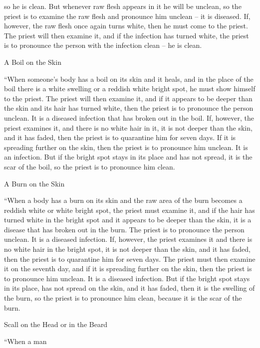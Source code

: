 {so he is clean.
But
whenever raw
flesh
appears
in it he will be unclean,
so
the priest
is to examine
the raw
flesh
and pronounce
him unclean –
it is
diseased.
If, however,
the raw
flesh
once again
turns
white,
then he must come
to
the priest.
The priest
will then examine
it, and if the infection
has turned
white,
the priest
is to pronounce the person with the infection
clean –
he is
clean.
\par }{\SH A Boil on the Skin
\par }{\PP {}“When
someone’s body
has
a boil
on its skin
and it heals,
and in the place
of the boil
there is a white
swelling
or
a reddish
white
bright spot,
he must show
himself to
the priest.
The priest
will then examine
it, and if it appears
to be deeper
than
the skin
and its hair
has turned
white,
then the priest
is to pronounce the person unclean.
It is a diseased
infection
that has broken
out in the boil.
If,
however, the priest
examines
it, and there
is no
white
hair
in it, it is not
deeper
than
the skin,
and it has faded,
then the priest
is to quarantine
him for seven
days.
If
it is spreading
further
on the skin,
then the priest
is to pronounce him unclean.
It is
an infection.
But if
the bright spot
stays
in its place
and has not
spread,
it is the scar
of the boil,
so the priest
is to pronounce him clean.
\par }{\SH A Burn on the Skin
\par }{\PP {}“When
a body
has
a burn
on its skin
and the raw area
of the burn
becomes
a reddish
white
or
white
bright spot,
the priest
must examine
it, and if the hair
has turned
white
in the bright spot
and it appears
to be deeper
than
the skin,
it is a disease
that
has broken out
in the burn.
The priest
is to pronounce
the person unclean.
It is
a diseased
infection.
If,
however, the priest
examines
it and there
is no
white
hair
in the bright spot,
it is not
deeper
than
the skin,
and it has faded,
then the priest
is to quarantine
him for seven
days.
The priest
must then examine
it on
the seventh
day,
and if
it is spreading
further
on the skin,
then the priest
is to pronounce him unclean.
It is
a diseased
infection.
But if
the bright spot
stays
in its place, has not
spread
on the skin,
and it has faded,
then it is the swelling
of the burn,
so the priest
is to pronounce him clean,
because
it is the scar
of the burn.
\par }{\SH Scall on the Head or in the Beard
\par }{\PP {}“When a man
}
